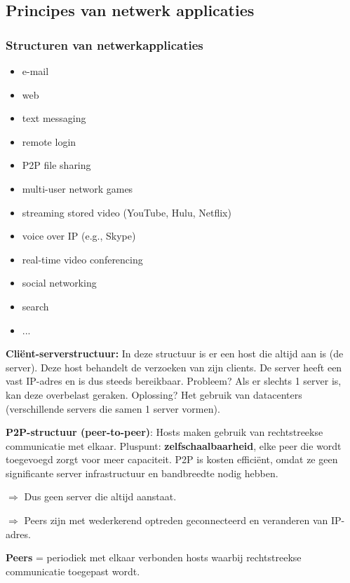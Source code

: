 \subsection{Principes van netwerk applicaties}

\subsubsection{Structuren van netwerkapplicaties}

\begin{multicols}{2}
  \begin{itemize}
      \item e-mail
 \item web
 \item text messaging
 \item remote login
 \item P2P file sharing
 \item multi-user network games
 \item streaming stored video (YouTube, Hulu, Netflix)
 \item voice over IP (e.g., Skype)
 \item real-time video conferencing
 \item social networking
 \item search
 \item ...
  \end{itemize}
\end{multicols}

\noindent \textbf{Cliënt-serverstructuur:} In deze structuur is er een host die altijd aan is (de server). Deze host behandelt de verzoeken van zijn clients. De server heeft een vast IP-adres en is dus steeds bereikbaar. Probleem? Als er slechts 1 server is, kan deze overbelast geraken. Oplossing? Het gebruik van datacenters (verschillende servers die samen 1 server vormen).

\textbf{P2P-structuur (peer-to-peer)}: Hosts maken gebruik van rechtstreekse communicatie met elkaar. Pluspunt: \textbf{zelfschaalbaarheid}, elke peer die wordt toegevoegd zorgt voor meer capaciteit. P2P is kosten efficiënt, omdat ze geen significante server infrastructuur en bandbreedte nodig hebben.

$\Rightarrow$ Dus geen server die altijd aanstaat.

$\Rightarrow$ Peers zijn met wederkerend optreden geconnecteerd en veranderen van IP-adres.

\textbf{Peers} = periodiek met elkaar verbonden hosts waarbij rechtstreekse communicatie toegepast wordt.

